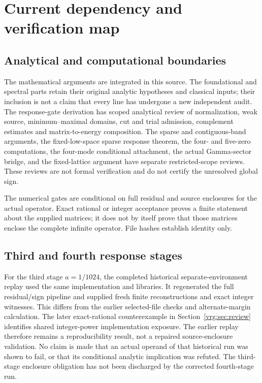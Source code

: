 \documentclass[11pt,a4paper]{article}
\numberwithin{equation}{section}
\theoremstyle{definition}\newtheorem{definition}[theorem]{Definition}
\theoremstyle{remark}\newtheorem{remark}[theorem]{Remark}
\begin{document}
\section{Current dependency and verification map}\label{app:current-evidence}
\subsection{Analytical and computational boundaries}
The mathematical arguments are integrated in this source. The foundational and spectral parts retain their original analytic hypotheses and classical inputs; their inclusion is not a claim that every line has undergone a new independent audit. The response-gate derivation has scoped analytical review of normalization, weak source, minimum--maximal domains, cut and trial admission, complement estimates and matrix-to-energy composition. The sparse and contiguous-band arguments, the fixed-low-space sparse response theorem, the four- and five-zero computations, the four-mode conditional attachment, the actual Gamma-sector bridge, and the fixed-lattice argument have separate restricted-scope reviews. These reviews are not formal verification and do not certify the unresolved global sign.

The numerical gates are conditional on full residual and source enclosures for the actual operator. Exact rational or integer acceptance proves a finite statement about the supplied matrices; it does not by itself prove that those matrices enclose the complete infinite operator. File hashes establish identity only.

\subsection{Third and fourth response stages}
For the third stage $a=1/1024$, the completed historical separate-environment
replay used the same implementation and libraries. It regenerated the
full residual/sign pipeline and supplied fresh finite reconstructions
and exact integer witnesses. This differs from the earlier selected-file
checks and alternate-margin calculation. The later exact-rational
counterexample in Section~\ref{vrg:sec:review} identifies shared
integer-power implementation exposure. The earlier replay therefore
remains a reproducibility result, not a repaired source-enclosure
validation. No claim is made that an actual operand of that historical
run was shown to fail, or that its conditional analytic implication was
refuted. The third-stage enclosure obligation has not been discharged by
the corrected fourth-stage run.
\end{document}
